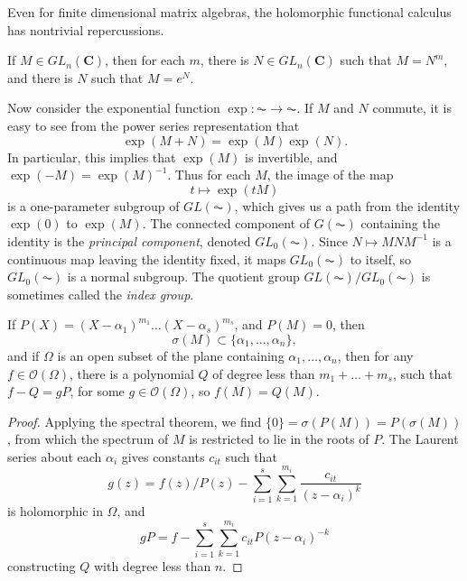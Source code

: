 Even for finite dimensional matrix algebras, the holomorphic functional calculus has nontrivial repercussions.

\begin{corollary}
    If $M \in GL_n(\mathbf{C})$, then for each $m$, there is $N \in GL_n(\mathbf{C})$ such that $M = N^m$, and there is $N$ such that $M = e^N$.
\end{corollary}

\begin{example}
    Now consider the exponential function $\exp: \AC \to \AC$. If $M$ and $N$ commute, it is easy to see from the power series representation that
    \[ \exp(M + N) = \exp(M) \exp(N). \]
    In particular, this implies that $\exp(M)$ is invertible, and $\exp(-M) = \exp(M)^{-1}$. Thus for each $M$, the image of the map
    \[ t \mapsto \exp(tM) \]
    is a one-parameter subgroup of $GL(\AC)$, which gives us a path from the identity $\exp(0)$ to $\exp(M)$. The connected component of $G(\AC)$ containing the identity is the \emph{principal component}, denoted $GL_0(\AC)$. Since $N \mapsto MNM^{-1}$ is a continuous map leaving the identity fixed, it maps $GL_0(\AC)$ to itself, so $GL_0(\AC)$ is a normal subgroup. The quotient group $GL(\AC)/GL_0(\AC)$ is sometimes called the \emph{index group}.
\end{example}

\begin{theorem}
    If $P(X) = (X - \alpha_1)^{m_1} \dots (X - \alpha_s)^{m_s}$, and $P(M) = 0$, then
    \[ \sigma(M) \subset \{ \alpha_1, \dots, \alpha_n \}, \]
    and if $\Omega$ is an open subset of the plane containing $\alpha_1, \dots, \alpha_n$, then for any $f \in \mathcal{O}(\Omega)$, there is a polynomial $Q$ of degree less than $m_1 + \dots + m_s$, such that $f - Q = gP$, for some $g \in \mathcal{O} (\Omega)$, so $f(M) = Q(M)$.
\end{theorem}
\begin{proof}
    Applying the spectral theorem, we find $\{ 0 \} = \sigma(P(M)) = P(\sigma(M))$, from which the spectrum of $M$ is restricted to lie in the roots of $P$. The Laurent series about each $\alpha_i$ gives constants $c_{it}$ such that
    \[ g(z) = f(z)/P(z) - \sum_{i = 1}^s \sum_{k = 1}^{m_i} \frac{c_{it}}{(z - \alpha_i)^k} \]
    is holomorphic in $\Omega$, and
    \[ gP = f - \sum_{i = 1}^s \sum_{k = 1}^{m_i} c_{it} P (z - \alpha_i)^{-k} \]
    constructing $Q$ with degree less than $n$.
\end{proof}

